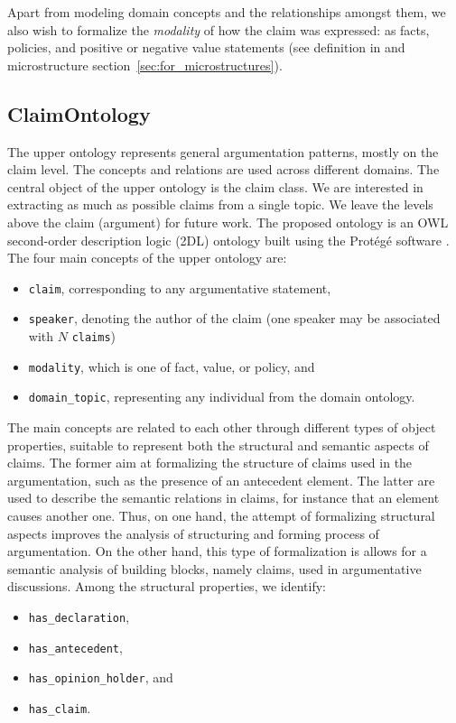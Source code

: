 Apart from modeling domain concepts and the relationships amongst them, we also
wish to formalize the \emph{modality} of how the claim was expressed: as facts,
policies, and positive or negative value statements (see definition in
\citep{rieke1997argumentation} and microstructure
section~\ref{sec:for_microstructures}). 

\subsection{ClaimOntology}
\label{subsec:claimontology}

The upper ontology represents general argumentation patterns, mostly on the claim level. 
The concepts and relations are used across different domains. 
The central object of the upper ontology is the claim class.
We are interested in extracting as much as possible claims from a single topic. 
We leave the levels above the claim (argument) for future work. The proposed
ontology is an OWL second-order description logic (2DL) ontology built using the
Prot\'{e}g\'{e} software \citep{gennari2003evolution}. The four main concepts of the
upper ontology are:
\begin{itemize}
	\item \texttt{claim}, corresponding to any argumentative statement,
	\item \texttt{speaker},  denoting the author of the claim
		(one speaker may be associated with $N$ \texttt{claims})
	\item \texttt{modality}, which is one of fact, value, or policy, and
	\item \texttt{domain\_topic}, representing any individual from the domain ontology.
\end{itemize}

The main concepts are related to each other through different types of object
properties, suitable to represent both the structural and semantic aspects of
claims. The former aim at formalizing the structure of claims used in
the argumentation, such as the presence of an antecedent element. The latter
are used to describe the semantic relations in claims, for instance that
an element causes another one. Thus, on one hand, the attempt of 
formalizing structural aspects improves the analysis of structuring and
forming process of argumentation. On the other hand, this type of formalization
is allows for a semantic analysis of building blocks, namely claims, used in 
argumentative discussions. Among the structural properties, we identify:
\begin{itemize}
\item \texttt{has\_declaration}, 
\item \texttt{has\_antecedent},
\item \texttt{has\_opinion\_holder}, and
\item \texttt{has\_claim}. 
\end{itemize}



